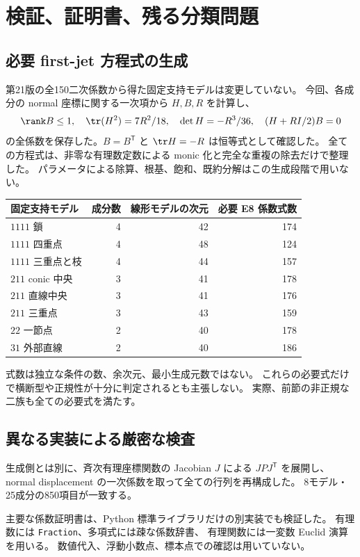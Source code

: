 \section{検証、証明書、残る分類問題}

\subsection{必要 first-jet 方程式の生成}
第21版の全150二次係数から得た固定支持モデルは変更していない。
今回、各成分の normal 座標に関する一次項から $H,B,R$ を計算し、
\[
 \rank B\le1,\quad \tr(H^2)=7R^2/18,\quad
 \det H=-R^3/36,\quad (H+RI/2)B=0
\]
の全係数を保存した。$B=B^{\mathsf T}$ と $\tr H=-R$ は恒等式として確認した。
全ての方程式は、非零な有理数定数による monic 化と完全な重複の除去だけで整理した。
パラメータによる除算、根基、飽和、既約分解はこの生成段階で用いない。

\begin{center}\small
\begin{tabular}{@{}lrrr@{}}\toprule
固定支持モデル & 成分数 & 線形モデルの次元 & 必要 E8 係数式数\\\midrule
$1111$ 鎖 & 4&42&174\\
$1111$ 四重点 &4&48&124\\
$1111$ 三重点と枝 &4&44&157\\
$211$ conic 中央 &3&41&178\\
$211$ 直線中央 &3&41&176\\
$211$ 三重点 &3&43&159\\
$22$ 一節点 &2&40&178\\
$31$ 外部直線 &2&40&186\\\bottomrule
\end{tabular}\end{center}
式数は独立な条件の数、余次元、最小生成元数ではない。
これらの必要式だけで横断型や正規性が十分に判定されるとも主張しない。
実際、前節の非正規な二族も全ての必要式を満たす。

\subsection{異なる実装による厳密な検査}
生成側とは別に、斉次有理座標関数の Jacobian $J$ による $J P J^{\mathsf T}$ を展開し、
normal displacement の一次係数を取って全ての行列を再構成した。
8モデル・25成分の850項目が一致する。

主要な係数証明書は、Python 標準ライブラリだけの別実装でも検証した。
有理数には \texttt{Fraction}、多項式には疎な係数辞書、
有理関数には一変数 Euclid 演算を用いる。
数値代入、浮動小数点、標本点での確認は用いていない。


